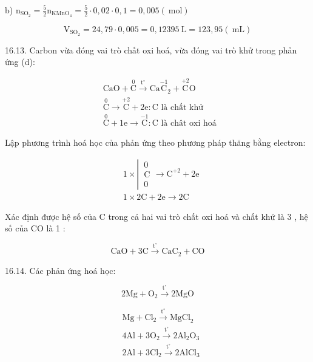\documentclass[10pt]{article}
\begin{document}
b) $\mathrm{n}_{\mathrm{SO}_{2}}=\frac{5}{2} \mathrm{n}_{\mathrm{KMnO}_{4}}=\frac{5}{2} \cdot 0,02 \cdot 0,1=0,005(\mathrm{~mol})$

$$
\mathrm{V}_{\mathrm{SO}_{2}}=24,79 \cdot 0,005=0,12395 \mathrm{~L}=123,95(\mathrm{~mL})
$$

16.13. Carbon vừa đóng vai trò chất oxi hoá, vừa đóng vai trò khử trong phản ứng (d):

$$
\begin{aligned}
& \mathrm{CaO}+\stackrel{0}{\mathrm{C}} \xrightarrow{\mathrm{t}^{\circ}} \mathrm{Ca} \stackrel{-1}{\mathrm{C}}_{2}+\stackrel{+2}{\mathrm{C}} \mathrm{O} \\
& \stackrel{0}{\mathrm{C}} \longrightarrow \stackrel{+2}{\mathrm{C}}+2 \mathrm{e}: \mathrm{C} \text { là chất khử } \\
& \stackrel{0}{\mathrm{C}}+1 \mathrm{e} \longrightarrow \stackrel{-1}{\mathrm{C}}: \mathrm{C} \text { là chât oxi hoá }
\end{aligned}
$$

Lập phương trình hoá học của phản ứng theo phương pháp thăng bằng electron:

$$
\begin{aligned}
& 1 \times \left\lvert\, \begin{array}{l}
0 \\
\mathrm{C} \\
0
\end{array} \longrightarrow \mathrm{C}^{+2}+2 \mathrm{e}\right. \\
& 1 \times 2 \mathrm{C}+2 \mathrm{e} \longrightarrow 2 \mathrm{C}
\end{aligned}
$$

Xác định được hệ số của C trong cả hai vai trò chất oxi hoá và chất khử là 3 , hệ số của CO là 1 :

$$
\mathrm{CaO}+3 \mathrm{C} \xrightarrow{\mathrm{t}^{\circ}} \mathrm{CaC}_{2}+\mathrm{CO}
$$

16.14. Các phản ứng hoá học:

$$
2 \mathrm{Mg}+\mathrm{O}_{2} \xrightarrow{\mathrm{t}^{\circ}} 2 \mathrm{MgO}
$$

$$
\begin{aligned}
& \mathrm{Mg}+\mathrm{Cl}_{2} \xrightarrow{\mathrm{t}^{\circ}} \mathrm{MgCl}_{2} \\
& 4 \mathrm{Al}+3 \mathrm{O}_{2} \xrightarrow{\mathrm{t}^{\circ}} 2 \mathrm{Al}_{2} \mathrm{O}_{3} \\
& 2 \mathrm{Al}+3 \mathrm{Cl}_{2} \xrightarrow{\mathrm{t}^{\circ}} 2 \mathrm{AlCl}_{3}
\end{aligned}
$$
\end{document}
